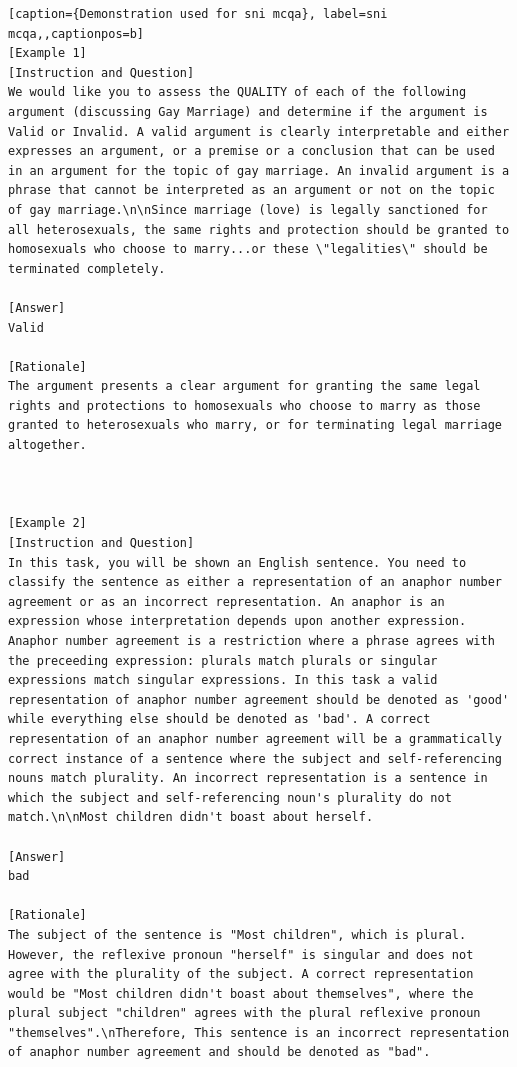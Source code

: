 \begin{lstlisting}[caption={Demonstration used for sni mcqa}, label=sni mcqa,,captionpos=b]
[Example 1]
[Instruction and Question]
We would like you to assess the QUALITY of each of the following argument (discussing Gay Marriage) and determine if the argument is Valid or Invalid. A valid argument is clearly interpretable and either expresses an argument, or a premise or a conclusion that can be used in an argument for the topic of gay marriage. An invalid argument is a phrase that cannot be interpreted as an argument or not on the topic of gay marriage.\n\nSince marriage (love) is legally sanctioned for all heterosexuals, the same rights and protection should be granted to homosexuals who choose to marry...or these \"legalities\" should be terminated completely.

[Answer]
Valid

[Rationale]
The argument presents a clear argument for granting the same legal rights and protections to homosexuals who choose to marry as those granted to heterosexuals who marry, or for terminating legal marriage altogether.



[Example 2]
[Instruction and Question]
In this task, you will be shown an English sentence. You need to classify the sentence as either a representation of an anaphor number agreement or as an incorrect representation. An anaphor is an expression whose interpretation depends upon another expression. Anaphor number agreement is a restriction where a phrase agrees with the preceeding expression: plurals match plurals or singular expressions match singular expressions. In this task a valid representation of anaphor number agreement should be denoted as 'good' while everything else should be denoted as 'bad'. A correct representation of an anaphor number agreement will be a grammatically correct instance of a sentence where the subject and self-referencing nouns match plurality. An incorrect representation is a sentence in which the subject and self-referencing noun's plurality do not match.\n\nMost children didn't boast about herself.

[Answer]
bad

[Rationale]
The subject of the sentence is "Most children", which is plural. However, the reflexive pronoun "herself" is singular and does not agree with the plurality of the subject. A correct representation would be "Most children didn't boast about themselves", where the plural subject "children" agrees with the plural reflexive pronoun "themselves".\nTherefore, This sentence is an incorrect representation of anaphor number agreement and should be denoted as "bad".




\end{lstlisting}
